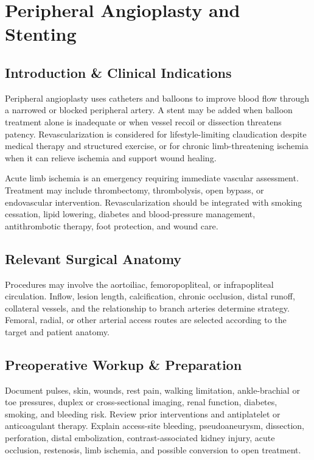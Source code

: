 \chapter{Peripheral Angioplasty and Stenting}

\section*{Introduction \& Clinical Indications}
Peripheral angioplasty uses catheters and balloons to improve blood flow through a narrowed or blocked peripheral artery. A stent may be added when balloon treatment alone is inadequate or when vessel recoil or dissection threatens patency. Revascularization is considered for lifestyle-limiting claudication despite medical therapy and structured exercise, or for chronic limb-threatening ischemia when it can relieve ischemia and support wound healing.

Acute limb ischemia is an emergency requiring immediate vascular assessment. Treatment may include thrombectomy, thrombolysis, open bypass, or endovascular intervention. Revascularization should be integrated with smoking cessation, lipid lowering, diabetes and blood-pressure management, antithrombotic therapy, foot protection, and wound care.

\section*{Relevant Surgical Anatomy}
Procedures may involve the aortoiliac, femoropopliteal, or infrapopliteal circulation. Inflow, lesion length, calcification, chronic occlusion, distal runoff, collateral vessels, and the relationship to branch arteries determine strategy. Femoral, radial, or other arterial access routes are selected according to the target and patient anatomy.

\section*{Preoperative Workup \& Preparation}
Document pulses, skin, wounds, rest pain, walking limitation, ankle-brachial or toe pressures, duplex or cross-sectional imaging, renal function, diabetes, smoking, and bleeding risk. Review prior interventions and antiplatelet or anticoagulant therapy. Explain access-site bleeding, pseudoaneurysm, dissection, perforation, distal embolization, contrast-associated kidney injury, acute occlusion, restenosis, limb ischemia, and possible conversion to open treatment.

